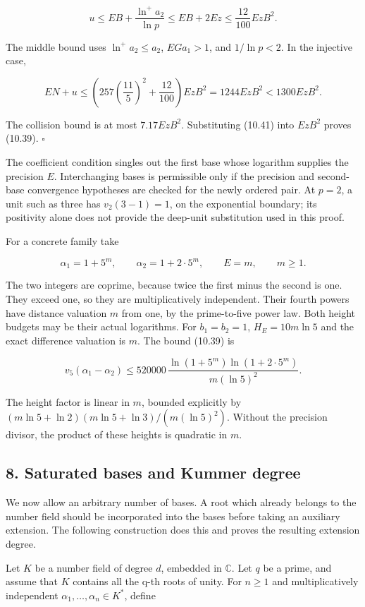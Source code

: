 \documentclass[
  11pt,
  a4paper,
]{article}
\begin{document}
\[
u\le EB+\frac{\ln^+a_2}{\ln p}
\le EB+2Ez\le\frac{12}{100}EzB^2.
\]

The middle bound uses \(\ln^+a_2\le a_2\), \(EGa_1>1\), and
\(1/\ln p<2\). In the injective case,

\[
EN+u\le
\left(257\left(\frac{11}{5}\right)^2+\frac{12}{100}\right)EzB^2
=1244EzB^2<1300EzB^2.
\]

The collision bound is at most \(7.17EzB^2\). Substituting (10.41) into
\(EzB^2\) proves (10.39). \(\square\)

The coefficient condition singles out the first base whose logarithm
supplies the precision \(E\). Interchanging bases is permissible only if
the precision and second-base convergence hypotheses are checked for the
newly ordered pair. At \(p=2\), a unit such as three has \(v_2(3-1)=1\),
on the exponential boundary; its positivity alone does not provide the
deep-unit substitution used in this proof.

For a concrete family take

\[
\alpha_1=1+5^m,\qquad \alpha_2=1+2\cdot5^m,\qquad E=m,\qquad m\ge1.
\]

The two integers are coprime, because twice the first minus the second
is one. They exceed one, so they are multiplicatively independent. Their
fourth powers have distance valuation \(m\) from one, by the
prime-to-five power law. Both height budgets may be their actual
logarithms. For \(b_1=b_2=1\), \(H_E=10m\ln5\) and the exact difference
valuation is \(m\). The bound (10.39) is

\[
v_5(\alpha_1-\alpha_2)
\le520000\,
\frac{\ln(1+5^m)\ln(1+2\cdot5^m)}{m(\ln5)^2}.
\tag{10.43}
\]

The height factor is linear in \(m\), bounded explicitly by
\((m\ln5+\ln2)(m\ln5+\ln3)/(m(\ln5)^2)\). Without the precision divisor,
the product of these heights is quadratic in \(m\).

\subsection{8. Saturated bases and Kummer
degree}\label{saturated-bases-and-kummer-degree}

We now allow an arbitrary number of bases. A root which already belongs
to the number field should be incorporated into the bases before taking
an auxiliary extension. The following construction does this and proves
the resulting extension degree.

Let \(K\) be a number field of degree \(d\), embedded in \(\mathbb C\).
Let \(q\) be a prime, and assume that \(K\) contains all the q-th roots
of unity. For \(n\ge1\) and multiplicatively independent
\(\alpha_1,\ldots,\alpha_n\in K^*\), define
\end{document}
